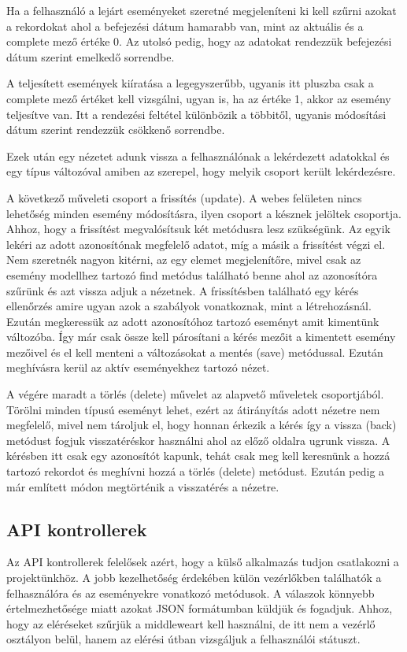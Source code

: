 \documentclass[
]{thesis-ekf}
\theoremstyle{definition}
\theoremstyle{remark}
\begin{document}
Ha a felhasználó a lejárt eseményeket szeretné megjeleníteni ki kell szűrni azokat a rekordokat ahol a befejezési dátum hamarabb van, mint az aktuális és a complete mező értéke 0. Az utolsó pedig, hogy az adatokat rendezzük befejezési dátum szerint emelkedő sorrendbe.

A teljesített események kiíratása a legegyszerűbb, ugyanis itt pluszba csak a complete mező értéket kell vizsgálni, ugyan is, ha az értéke 1, akkor az esemény teljesítve van. Itt a rendezési feltétel különbözik a többitől, ugyanis módosítási dátum szerint rendezzük csökkenő sorrendbe.

Ezek után egy nézetet adunk vissza a felhasználónak a lekérdezett adatokkal és egy típus változóval amiben az szerepel, hogy melyik csoport került lekérdezésre.

A következő műveleti csoport a frissítés (update). A webes felületen nincs lehetőség minden esemény módosításra, ilyen csoport a késznek jelöltek csoportja. Ahhoz, hogy a frissítést megvalósítsuk két metódusra lesz szükségünk. Az egyik lekéri az adott azonosítónak megfelelő adatot, míg a másik a frissítést végzi el. Nem szeretnék nagyon kitérni, az egy elemet megjelenítőre, mivel csak az esemény modellhez tartozó find metódus található benne ahol az azonosítóra szűrünk és azt vissza adjuk a nézetnek. A frissítésben található egy kérés ellenőrzés amire ugyan azok a szabályok vonatkoznak, mint a létrehozásnál. Ezután megkeressük az adott azonosítóhoz tartozó eseményt amit kimentünk változóba. Így már csak össze kell párosítani a kérés mezőit a kimentett esemény mezőivel és el kell menteni a változásokat a mentés (save) metódussal. Ezután meghívásra kerül az aktív eseményekhez tartozó nézet. 

A végére maradt a törlés (delete) művelet az alapvető műveletek csoportjából. Törölni minden típusú eseményt lehet, ezért az átirányítás adott nézetre nem megfelelő, mivel nem tároljuk el, hogy honnan érkezik a kérés így a vissza (back) metódust fogjuk visszatéréskor használni ahol az előző oldalra ugrunk vissza. A kérésben itt csak egy azonosítót kapunk, tehát csak meg kell keresnünk a hozzá tartozó rekordot és meghívni hozzá a törlés (delete) metódust. Ezután pedig a már említett módon megtörténik a visszatérés a nézetre. 

\subsection{API kontrollerek}

Az API kontrollerek felelősek azért, hogy a külső alkalmazás tudjon csatlakozni a projektünkhöz. A jobb kezelhetőség érdekében külön vezérlőkben találhatók a felhasználóra és az eseményekre vonatkozó metódusok. A válaszok könnyebb értelmezhetősége miatt azokat JSON formátumban küldjük és fogadjuk. Ahhoz, hogy az eléréseket szűrjük a middleweart kell használni, de itt nem a vezérlő osztályon belül, hanem az elérési útban vizsgáljuk a felhasználói státuszt.
\end{document}
